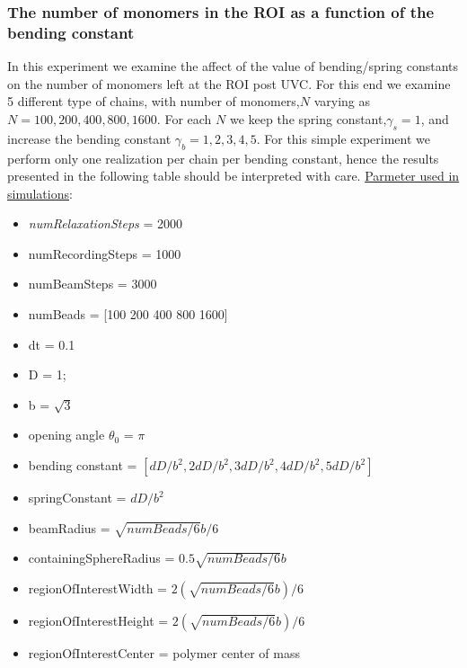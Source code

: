 \documentclass[12pt]{report}
\begin{document}
	 \subsubsection{The number of monomers in the ROI as a function of the bending constant}
	  In this experiment we examine the affect of the value of bending/spring constants on the number of monomers left at the ROI post UVC. 
	  For this end we examine 5 different type of chains, with number of monomers,$N$ varying as $N=100, 200, 400, 800,1600$. For each $N$ we keep the spring constant,$\gamma_s=1$, and increase the bending constant $\gamma_b= 1,2,3,4,5$. For this simple experiment we perform only one realization per chain per bending constant, hence the results presented in the following table should be interpreted  with care. 
	  \underline{Parmeter used in simulations}:
	  
	  \begin{itemize}
	  	\item \textit{numRelaxationSteps} = 2000
	  	\item numRecordingSteps  = 1000
	  	\item numBeamSteps       = 3000
	  	\item numBeads = [100 200 400 800 1600]
	  	\item dt       = 0.1
	  	\item D        = 1;
	  	\item b        = $\sqrt{3}$
	  	\item opening angle $\theta_0$ = $\pi$
	  	\item bending constant = $[dD/b^2, 2dD/b^2,3dD/b^2,4dD/b^2, 5dD/b^2]$
	  	\item springConstant   = $dD/b^2$
	  	\item beamRadius = $\sqrt{numBeads/6}b/6$
	  	\item containingSphereRadius = $0.5\sqrt{numBeads/6}b$
	  	\item regionOfInterestWidth  = $2(\sqrt{numBeads/6}b)/6$
	  	\item regionOfInterestHeight = $2(\sqrt{numBeads/6}b)/6$
	  	\item regionOfInterestCenter = polymer center of mass
	  \end{itemize}
	  
\end{document}
